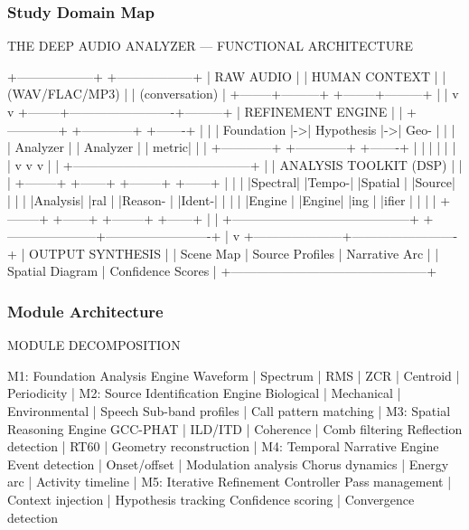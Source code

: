 \documentclass[11pt,letterpaper]{article}
\begin{document}
\subsubsection{Study Domain Map}

\begin{asciibox}
THE DEEP AUDIO ANALYZER — FUNCTIONAL ARCHITECTURE

  +------------------+     +------------------+
  |   RAW AUDIO      |     |   HUMAN CONTEXT  |
  |   (WAV/FLAC/MP3) |     |   (conversation) |
  +--------+---------+     +--------+---------+
           |                         |
           v                         v
  +--------+-------------------------+---------+
  |            REFINEMENT ENGINE               |
  |  +------------+  +------------+  +-------+ |
  |  | Foundation |->| Hypothesis |->| Geo-  | |
  |  | Analyzer   |  | Analyzer   |  | metric| |
  |  +------------+  +------------+  +-------+ |
  |        |               |             |      |
  |        v               v             v      |
  |  +------------------------------------------+
  |  |         ANALYSIS TOOLKIT (DSP)           |
  |  | +--------+ +------+ +--------+ +------+ |
  |  | |Spectral| |Tempo-| |Spatial | |Source| |
  |  | |Analysis| |ral   | |Reason- | |Ident-| |
  |  | |Engine  | |Engine| |ing     | |ifier | |
  |  | +--------+ +------+ +--------+ +------+ |
  |  +------------------------------------------+
  +---------------------+-------------------------+
                        |
                        v
  +---------------------+-------------------------+
  |              OUTPUT SYNTHESIS                  |
  |  Scene Map | Source Profiles | Narrative Arc   |
  |  Spatial Diagram | Confidence Scores          |
  +-----------------------------------------------+
\end{asciibox}

\subsubsection{Module Architecture}

\begin{asciibox}
MODULE DECOMPOSITION

  M1: Foundation Analysis Engine
      Waveform | Spectrum | RMS | ZCR | Centroid | Periodicity
          |
  M2: Source Identification Engine
      Biological | Mechanical | Environmental | Speech
      Sub-band profiles | Call pattern matching
          |
  M3: Spatial Reasoning Engine
      GCC-PHAT | ILD/ITD | Coherence | Comb filtering
      Reflection detection | RT60 | Geometry reconstruction
          |
  M4: Temporal Narrative Engine
      Event detection | Onset/offset | Modulation analysis
      Chorus dynamics | Energy arc | Activity timeline
          |
  M5: Iterative Refinement Controller
      Pass management | Context injection | Hypothesis tracking
      Confidence scoring | Convergence detection
\end{asciibox}
\end{document}
